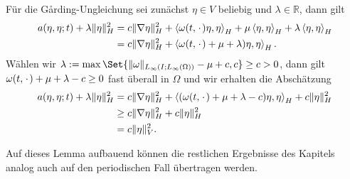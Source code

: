 \begin{Lemma}
\begin{Beweis}
        Für die G\aa{}rding-Ungleichung sei zunächst $\eta \in V$ beliebig und $\lambda \in \mathbb{R}$, dann gilt
        \begin{align}
            a(\eta, \eta; t) + \lambda \lVert\eta\rVert^{2}_{H}
            &= c \lVert\nabla \eta\rVert^{2}_{H} + \left\langle\omega(t, {\mkern2mu\cdot\mkern2mu}) \eta,\eta\right\rangle_{H} + \mu \left\langle\eta,\eta\right\rangle_{H} + \lambda \left\langle\eta,\eta\right\rangle_{H}
            \\&= c \lVert\nabla \eta\rVert^{2}_{H} + \left\langle\omega(t, {\mkern2mu\cdot\mkern2mu}) + \mu + \lambda) \eta,\eta\right\rangle_{H}.
        \end{align}
        Wählen wir $\lambda := \max\Set{\norm{\omega}_{L_{\infty}(I; L_{\infty}(\Omega))} - \mu + c, c} \geq c > 0$, dann gilt $\omega(t, {\mkern2mu\cdot\mkern2mu}) + \mu + \lambda - c \geq 0$ fast überall in $\Omega$ und wir erhalten die Abschätzung
        \begin{align}
            a(\eta, \eta; t) + \lambda \lVert\eta\rVert^{2}_{H}
            &= c \lVert\nabla \eta\rVert^{2}_{H} + \left\langle(\omega(t, {\mkern2mu\cdot\mkern2mu}) + \mu + \lambda - c) \eta,\eta\right\rangle_{H} + c \lVert\eta\rVert^{2}_{H} \\
            &\geq c \lVert\nabla \eta\rVert^{2}_{H} + c \lVert\eta\rVert^{2}_{H}
            \\&= c \lVert\eta\rVert^{2}_{V}.
        \end{align}
    \end{Beweis}
\end{Lemma}

Auf dieses Lemma aufbauend können die restlichen Ergebnisse des Kapitels analog auch auf den periodischen Fall übertragen werden.

